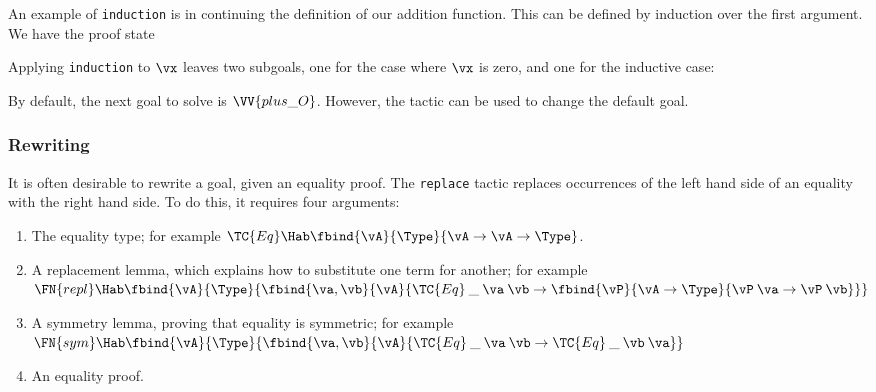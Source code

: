 


An example of \texttt{induction} is in continuing the definition of
our addition function. This can be defined by induction over the first
argument. We have the proof state


Applying \texttt{induction} to $\vx$ leaves two subgoals, one for the
case where $\vx$ is zero, and one for the inductive case:


By default, the next goal to solve is $\VV{plus\_O}$. However, the
 tactic can be used to change the default goal.

\subsubsection{Rewriting}

It is often desirable to rewrite a goal, given an equality proof. The
\texttt{replace} tactic replaces occurrences of the left hand side of
an equality with the right hand side. To do this, it requires four
arguments:

\begin{enumerate}
\item The equality type; for example
  $\TC{Eq}\Hab\fbind{\vA}{\Type}{\vA\to\vA\to\Type}$.
\item A replacement lemma, which explains how to substitute one term
  for another; for example\\
  $\FN{repl}\Hab\fbind{\vA}{\Type}{
    \fbind{\va,\vb}{\vA}{
	\TC{Eq}\:\_\:\va\:\vb\to\fbind{\vP}{\vA\to\Type}{
	  \vP\:\va\to\vP\:\vb}}}$
\item A symmetry lemma, proving that equality is symmetric; for
  example\\
  $\FN{sym}\Hab\fbind{\vA}{\Type}{
      \fbind{\va,\vb}{\vA}{\TC{Eq}\:\_\:\va\:\vb\to\TC{Eq}\:\_\:\vb\:\va}}$
\item An equality proof.
\end{enumerate}

